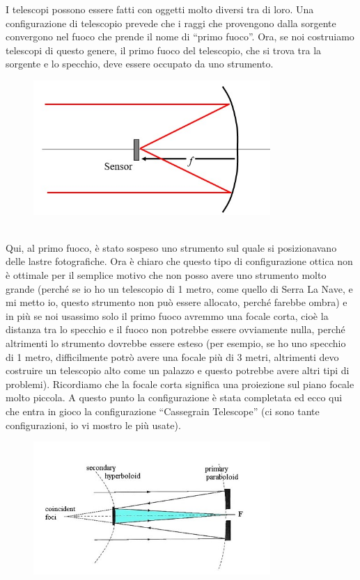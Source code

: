 \documentclass[a4paper,11pt]{article}
\begin{document}
I telescopi possono essere fatti con oggetti molto diversi tra di loro. Una configurazione di telescopio prevede che i raggi che provengono dalla sorgente convergono nel fuoco che prende il nome di “primo fuoco”. Ora, se noi costruiamo telescopi di questo genere, il primo fuoco del telescopio, che si trova tra la sorgente e lo specchio, deve essere occupato da uno strumento.
\begin{figure}[h!!]
        \centering
        \includegraphics[width=9cm]{1.jpg}
        \label{}
    \end{figure}
\\Qui, al primo fuoco, è stato sospeso uno strumento sul quale si posizionavano delle lastre fotografiche. 
Ora è chiaro che questo tipo di configurazione ottica non è ottimale per il semplice motivo che non posso avere uno strumento molto grande (perché se io ho un telescopio di 1 metro, come quello di Serra La Nave, e mi metto io, questo strumento non può essere allocato, perché farebbe ombra) e in più se noi usassimo solo il primo fuoco avremmo una focale corta, cioè la distanza tra lo specchio e il fuoco non potrebbe essere ovviamente nulla, perché altrimenti lo strumento dovrebbe essere esteso (per esempio, se ho uno specchio di 1 metro, difficilmente potrò avere una focale più di 3 metri, altrimenti devo costruire un telescopio alto come un palazzo e questo potrebbe avere altri tipi di problemi). Ricordiamo che la focale corta significa una proiezione sul piano focale molto piccola.
A questo punto la configurazione è stata completata ed ecco qui che entra in gioco la configurazione “Cassegrain Telescope” (ci sono tante configurazioni, io vi mostro le più usate).
\begin{figure}[h!!]
        \centering
        \includegraphics[width=9cm]{2.jpg}
        \label{}
    \end{figure}
\end{document}
